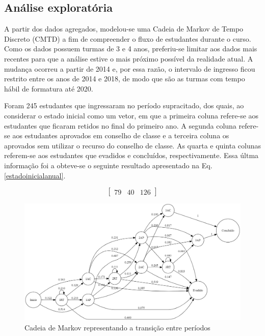 \documentclass{article}
\begin{document}
  
\subsection{Análise exploratória}\label{cadeia_de_markov}

A partir dos dados agregados, modelou-se uma Cadeia de Markov de Tempo Discreto (CMTD) a fim de compreender o fluxo de estudantes durante o curso. Como os dados possuem turmas de 3 e 4 anos, preferiu-se limitar aos dados mais recentes para que a análise estive o mais próximo possível da realidade atual. A mudança ocorreu a partir de 2014 e, por essa razão, o intervalo de ingresso ficou restrito entre os anos de 2014 e 2018, de modo que são as turmas com tempo hábil de formatura até 2020. 

Foram 245 estudantes que ingressaram no período supracitado, dos quais, ao considerar o estado inicial como um vetor, em que a primeira coluna refere-se aos estudantes que ficaram retidos no final do primeiro ano. A segunda coluna refere-se aos estudantes aprovados em conselho de classe e a terceira coluna os aprovados sem utilizar o recurso do conselho de classe. As quarta e quinta colunas referem-se aos estudantes que evadidos e concluídos, respectivamente. Essa últma informação foi a  obteve-se o seguinte resultado apresentado na Eq. \ref{estadoinicialanual}.

\begin{equation}
\begin{bmatrix}
    79 & 40 & 126  
\end{bmatrix}
\label{estadoinicialanual}
\end{equation}

\begin{figure}[H]
\centering
\includegraphics[width=1\textwidth]{markovperiodos.png}
\caption{Cadeia de Markov representando a transição entre períodos}
\label{markovPeriodos}
\end{figure}
\end{document}
